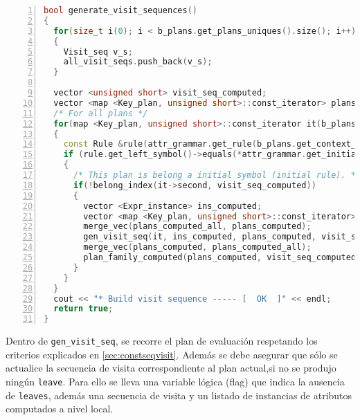 \begin{lstlisting}[language=C++, basicstyle=\tiny, numbers=left, columns=fullflexible, linewidth=14.5cm]
bool generate_visit_sequences()
{
  for(size_t i(0); i < b_plans.get_plans_uniques().size(); i++)
  {
    Visit_seq v_s;
    all_visit_seqs.push_back(v_s);
  }

  vector <unsigned short> visit_seq_computed;
  vector <map <Key_plan, unsigned short>::const_iterator> plans_computed_all;
  /* For all plans */
  for(map <Key_plan, unsigned short>::const_iterator it(b_plans.get_plans().begin()); it != b_plans.get_plans().end(); it++)
  {
    const Rule &rule(attr_grammar.get_rule(b_plans.get_context_unique(it->first.id_plan)[0]));
    if (rule.get_left_symbol()->equals(*attr_grammar.get_initial_symb()))
    {
      /* This plan is belong a initial symbol (initial rule). */
      if(!belong_index(it->second, visit_seq_computed))
      {
        vector <Expr_instance> ins_computed;
        vector <map <Key_plan, unsigned short>::const_iterator> plans_computed;
        merge_vec(plans_computed_all, plans_computed);
        gen_visit_seq(it, ins_computed, plans_computed, visit_seq_computed);
        merge_vec(plans_computed, plans_computed_all);
        plan_family_computed(plans_computed, visit_seq_computed);
      }
    }
  }
  cout << "* Build visit sequence ----- [  OK  ]" << endl;
  return true;
}
\end{lstlisting}

Dentro de \texttt{gen\_visit\_seq}, se recorre el plan de evaluación respetando los criterios explicados en \ref{sec:constseqvisit}. Además se debe asegurar que sólo se actualice la secuencia de visita correspondiente al plan actual,si no se produjo ningún \texttt{leave}. Para ello se lleva una variable lógica (flag) que indica la ausencia de \texttt{leaves}, además una secuencia de visita y un listado de instancias de atributos computados a nivel local.

